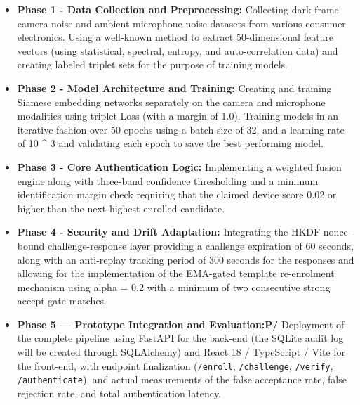 \begin{itemize}
    \item \textbf{Phase 1 - Data Collection and Preprocessing:} Collecting dark frame camera noise and ambient microphone noise datasets from various consumer electronics. Using a well-known method to extract 50-dimensional feature vectors (using statistical, spectral, entropy, and auto-correlation data) and creating labeled triplet sets for the purpose of training models. 

    \item \textbf{Phase 2 - Model Architecture and Training:} Creating and training Siamese embedding networks separately on the camera and microphone modalities using triplet Loss (with a margin of 1.0). Training models in an iterative fashion over 50 epochs using a batch size of 32, and a learning rate of 10 ^ 3 and validating each epoch to save the best performing model.

    \item \textbf{Phase 3 - Core Authentication Logic:} Implementing a weighted fusion engine along with three-band confidence thresholding and a minimum identification margin check requiring that the claimed device score 0.02 or higher than the next highest enrolled candidate. 

    \item \textbf{Phase 4 - Security and Drift Adaptation:} Integrating the HKDF nonce-bound challenge-response layer providing a challenge expiration of 60 seconds, along with an anti-replay tracking period of 300 seconds for the responses and allowing for the implementation of the EMA-gated template re-enrolment mechanism using alpha = 0.2 with a minimum of two consecutive strong accept gate matches.

    \item \textbf{Phase 5 — Prototype Integration and Evaluation:P/} Deployment of the complete pipeline using FastAPI for the back-end (the SQLite audit log will be created through SQLAlchemy) and React 18 / TypeScript / Vite for the front-end, with endpoint finalization  (\texttt{/enroll}, \texttt{/challenge}, \texttt{/verify}, \texttt{/authenticate}), and actual measurements of the false acceptance rate, false rejection rate, and total authentication latency.
\end{itemize}
